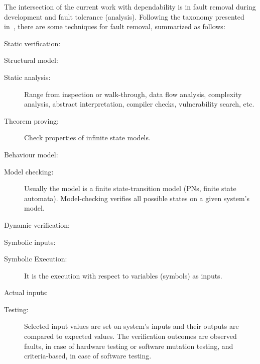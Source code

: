 \begin{sloppypar}
The intersection of the current work with dependability is in fault removal during development and fault tolerance (analysis).
Following the taxonomy presented in~\cite{ALR+2004}, there are some techniques for fault removal, summarized as follows:
\begin{alineas}
  \item Static verification:
  \begin{subalineas}
    \item Structural model:
    \begin{description}
      \item[Static analysis:] Range from inspection or walk-through, data flow analysis, complexity analysis, abstract interpretation, compiler checks, vulnerability search, etc.
      \item[Theorem proving:] Check properties of infinite state models.
    \end{description}
    \item Behaviour model:
    \begin{description}
      \item[Model checking:] Usually the model is a finite state-transition model (\acp{PN}, finite state automata).
      Model-checking verifies all possible states on a given system's model.
    \end{description}
  \end{subalineas}
  \item Dynamic verification:
  \begin{subalineas}
    \item Symbolic inputs:
    \begin{description}
      \item[Symbolic Execution:] It is the execution with respect to variables (symbols) as inputs.
    \end{description}
    \item Actual inputs:
    \begin{description}
      \item[Testing:] Selected input values are set on system's inputs and their outputs are compared to expected values.
      The verification outcomes are observed faults, in case of hardware testing or software mutation testing, and criteria-based, in case of software testing.
    \end{description}
  \end{subalineas}
\end{alineas}
\end{sloppypar}


